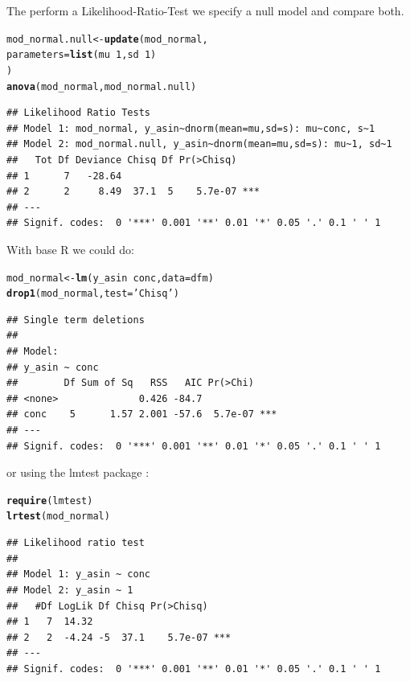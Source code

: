 \documentclass{scrartcl}\usepackage[]{graphicx}\usepackage[]{color}
\makeatletter
\newcommand{\hlnum}[1]{\textcolor[rgb]{0.686,0.059,0.569}{#1}}%
\newcommand{\hlstr}[1]{\textcolor[rgb]{0.192,0.494,0.8}{#1}}%
\newcommand{\hlopt}[1]{\textcolor[rgb]{0,0,0}{#1}}%
\newcommand{\hlstd}[1]{\textcolor[rgb]{0.345,0.345,0.345}{#1}}%
\newcommand{\hlkwb}[1]{\textcolor[rgb]{0.69,0.353,0.396}{#1}}%
\newcommand{\hlkwc}[1]{\textcolor[rgb]{0.333,0.667,0.333}{#1}}%
\newcommand{\hlkwd}[1]{\textcolor[rgb]{0.737,0.353,0.396}{\textbf{#1}}}%
\newenvironment{kframe}{%
 \def\at@end@of@kframe{}%
 \ifinner\ifhmode%
  \def\at@end@of@kframe{\end{minipage}}%
  \begin{minipage}{\columnwidth}%
 \fi\fi%
 \def\FrameCommand##1{\hskip\@totalleftmargin \hskip-\fboxsep
 \colorbox{shadecolor}{##1}\hskip-\fboxsep
     \hskip-\linewidth \hskip-\@totalleftmargin \hskip\columnwidth}%
 \MakeFramed {\advance\hsize-\width
   \@totalleftmargin\z@ \linewidth\hsize
   \@setminipage}}%
 {\par\unskip\endMakeFramed%
 \at@end@of@kframe}
\newenvironment{knitrout}{}{} %
\makeatother
\begin{document}
The perform a Likelihood-Ratio-Test we specify a null model and compare both.
\begin{knitrout}
\color{fgcolor}\begin{kframe}
\begin{alltt}
\hlstd{mod_normal.null} \hlkwb{<-} \hlkwd{update}\hlstd{(mod_normal,}
                     \hlkwc{parameters} \hlstd{=} \hlkwd{list}\hlstd{(mu} \hlopt{~} \hlnum{1}\hlstd{, sd} \hlopt{~} \hlnum{1}\hlstd{)}
                     \hlstd{)}
\hlkwd{anova}\hlstd{(mod_normal, mod_normal.null)}
\end{alltt}
\begin{verbatim}
## Likelihood Ratio Tests
## Model 1: mod_normal, y_asin~dnorm(mean=mu,sd=s): mu~conc, s~1
## Model 2: mod_normal.null, y_asin~dnorm(mean=mu,sd=s): mu~1, sd~1
##   Tot Df Deviance Chisq Df Pr(>Chisq)    
## 1      7   -28.64                        
## 2      2     8.49  37.1  5    5.7e-07 ***
## ---
## Signif. codes:  0 '***' 0.001 '**' 0.01 '*' 0.05 '.' 0.1 ' ' 1
\end{verbatim}
\end{kframe}
\end{knitrout}

With base R we could do:
\begin{knitrout}
\color{fgcolor}\begin{kframe}
\begin{alltt}
\hlstd{mod_normal} \hlkwb{<-} \hlkwd{lm}\hlstd{(y_asin} \hlopt{~} \hlstd{conc,} \hlkwc{data} \hlstd{= dfm)}
\hlkwd{drop1}\hlstd{(mod_normal,} \hlkwc{test} \hlstd{=} \hlstr{'Chisq'}\hlstd{)}
\end{alltt}
\begin{verbatim}
## Single term deletions
## 
## Model:
## y_asin ~ conc
##        Df Sum of Sq   RSS   AIC Pr(>Chi)    
## <none>              0.426 -84.7             
## conc    5      1.57 2.001 -57.6  5.7e-07 ***
## ---
## Signif. codes:  0 '***' 0.001 '**' 0.01 '*' 0.05 '.' 0.1 ' ' 1
\end{verbatim}
\end{kframe}
\end{knitrout}
or using the lmtest package \citep{zeileis_diagnostic_2002}:
\begin{knitrout}
\color{fgcolor}\begin{kframe}
\begin{alltt}
\hlkwd{require}\hlstd{(lmtest)}
\hlkwd{lrtest}\hlstd{(mod_normal)}
\end{alltt}
\begin{verbatim}
## Likelihood ratio test
## 
## Model 1: y_asin ~ conc
## Model 2: y_asin ~ 1
##   #Df LogLik Df Chisq Pr(>Chisq)    
## 1   7  14.32                        
## 2   2  -4.24 -5  37.1    5.7e-07 ***
## ---
## Signif. codes:  0 '***' 0.001 '**' 0.01 '*' 0.05 '.' 0.1 ' ' 1
\end{verbatim}
\end{kframe}
\end{knitrout}
\end{document}
